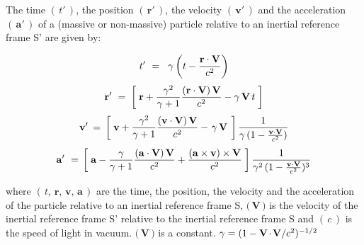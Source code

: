 \documentclass[10pt,fleqn]{article}
\begin{document}
\noindent The time $( \, {t}' \, )$, the position $( \, {\mathbf{r}}' \, )$, the velocity $( \, {\mathbf{v}}' \, )$ and the acceleration $( \, {\mathbf{a}}' \, )$ of a (massive or non-massive) particle relative to an inertial reference frame S' are given by:
\par \vspace{+0.21em}
\begin{eqnarray*}
{t}' ~=~ \hspace{+0.24em} \gamma \left ( t - \frac{\mathbf{r} \cdot \mathbf{V}}{c^2} \right )
\end{eqnarray*}
\vspace{-0.45em}
\begin{eqnarray*}
{\mathbf{r}}' ~=~ \hspace{-0.09em} \left [ \; \mathbf{r} + \frac{\gamma^2}{\gamma + 1} \frac{( \mathbf{r} \cdot \mathbf{V} ) \, \mathbf{V}}{c^2} - \gamma \, \mathbf{V} \, t \; \right ]
\end{eqnarray*}
\vspace{-0.30em}
\begin{eqnarray*}
{\mathbf{v}}' \hspace{-0.12em} ~=~ \hspace{-0.12em} \left [ \; \mathbf{v} + \frac{\gamma^2}{\gamma + 1} \frac{( \mathbf{v} \cdot \mathbf{V} ) \, \mathbf{V}}{c^2} - \hspace{+0.114em} \gamma \, \mathbf{V} \hspace{+0.114em} \; \right ] \frac{1}{\gamma \, ( 1 - \frac{\mathbf{v} \cdot \mathbf{V}}{c^2} )}
\end{eqnarray*}
\vspace{-0.30em}
\begin{eqnarray*}
{\mathbf{a}}' ~=~ \hspace{-0.18em} \left [ \; \mathbf{a} - \frac{\gamma}{\gamma + 1} \frac{( \mathbf{a} \cdot \mathbf{V} ) \, \mathbf{V}}{c^2} + \frac{( \mathbf{a} \times \mathbf{v} ) \times \mathbf{V}}{c^2} \; \right ] \frac{1}{\gamma^2 \, ( 1 - \frac{\mathbf{v} \cdot \mathbf{V}}{c^2} )^3}
\end{eqnarray*}
\par \vspace{+1.20em}
\noindent where $( \, t, \, \mathbf{r}, \, \mathbf{v}, \, \mathbf{a} \, )$ are the time, the position, the velocity and the acceleration of the particle relative to an inertial reference frame S, $( \, ${\small $\mathbf{V}$}$ \, )$ is the velocity of the inertial reference frame S' relative to the inertial reference frame S and $( \, c \, )$ is the speed of light in vacuum. $( \, ${\small $\mathbf{V}$}$ \, )$ is a constant. {\small $\gamma = ({1 - \mathbf{V} \hspace{-0.114em}\cdot\hspace{-0.114em} \mathbf{V}/c^2})^{-1/2}$}
\end{document}
